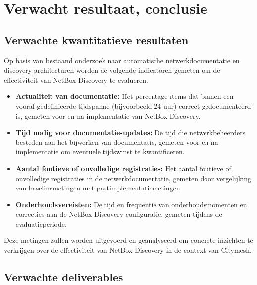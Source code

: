 \section{Verwacht resultaat, conclusie}%
\label{sec:verwachte_resultaten}

\subsection{Verwachte kwantitatieve resultaten}

Op basis van bestaand onderzoek naar automatische netwerkdocumentatie en discovery-architecturen worden de volgende indicatoren gemeten om de effectiviteit van NetBox Discovery te evalueren.\autocite{Campbell2007}

\begin{itemize}
  \item \textbf{Actualiteit van documentatie:} Het percentage items dat binnen een vooraf gedefinieerde tijdspanne (bijvoorbeeld 24 uur) correct gedocumenteerd is, gemeten voor en na implementatie van NetBox Discovery.
  \item \textbf{Tijd nodig voor documentatie-updates:} De tijd die netwerkbeheerders besteden aan het bijwerken van documentatie, gemeten voor en na implementatie om eventuele tijdswinst te kwantificeren.
  \item \textbf{Aantal foutieve of onvolledige registraties:} Het aantal foutieve of onvolledige registraties in de netwerkdocumentatie, gemeten door vergelijking van baselinemetingen met postimplementatiemetingen.
  \item \textbf{Onderhoudsvereisten:} De tijd en frequentie van onderhoudsmomenten en correcties aan de NetBox Discovery-configuratie, gemeten tijdens de evaluatieperiode.
\end{itemize}

Deze metingen zullen worden uitgevoerd en geanalyseerd om concrete inzichten te verkrijgen over de effectiviteit van NetBox Discovery in de context van Citymesh.

\subsection{Verwachte deliverables}

